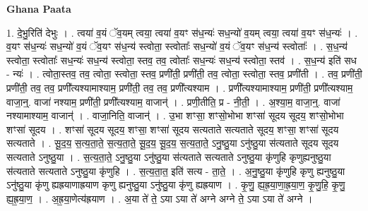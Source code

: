 \documentclass[17pt]{extarticle}
\begin{document}
\textbf{Ghana Paata } \newline

1. दे॒भु॒रिति॑ देभुः । . त्वया॑ व॒यं ॅव॒यम् त्वया॒ त्वया॑ व॒यꣳ स॑ध॒न्यः॑ सध॒न्यो॑ व॒यम् त्वया॒ त्वया॑ व॒यꣳ स॑ध॒न्यः॑ । . व॒यꣳ स॑ध॒न्यः॑ सध॒न्यो॑ व॒यं ॅव॒यꣳ स॑ध॒न्य॑ स्त्वोता॒ स्त्वोताः᳚ सध॒न्यो॑ व॒यं ॅव॒यꣳ स॑ध॒न्य॑ स्त्वोताः᳚ । . स॒ध॒न्य॑ स्त्वोता॒ स्त्वोताः᳚ सध॒न्यः॑ सध॒न्य॑ स्त्वोता॒ स्तव॒ तव॒ त्वोताः᳚ सध॒न्यः॑ सध॒न्य॑ स्त्वोता॒ स्तव॑ । . स॒ध॒न्य॑ इति॑ सध - न्यः॑ । . त्वोता॒स्तव॒ तव॒ त्वोता॒ स्त्वोता॒ स्तव॒ प्रणी॑ती॒ प्रणी॑ती॒ तव॒ त्वोता॒ स्त्वोता॒ स्तव॒ प्रणी॑ती । . तव॒ प्रणी॑ती॒ प्रणी॑ती॒ तव॒ तव॒ प्रणी᳚त्यश्यामाश्याम॒ प्रणी॑ती॒ तव॒ तव॒ प्रणी᳚त्यश्याम । . प्रणी᳚त्यश्यामाश्याम॒ प्रणी॑ती॒ प्रणी᳚त्यश्याम॒ वाजा॒न्॒. वाजा॑ नश्याम॒ प्रणी॑ती॒ प्रणी᳚त्यश्याम॒ वाजान्॑ । . प्रणी॒तीति॒ प्र - नी॒ती॒ । . अ॒श्या॒म॒ वाजा॒न्॒. वाजा॑ नश्यामाश्याम॒ वाजान्॑ । . वाजा॒निति॒ वाजान्॑ । . उ॒भा शꣳसा॒ शꣳसो॒भोभा शꣳसा॑ सूदय सूदय॒ शꣳसो॒भोभा शꣳसा॑ सूदय । . शꣳसा॑ सूदय सूदय॒ शꣳसा॒ शꣳसा॑ सूदय सत्यताते सत्यताते सूदय॒ शꣳसा॒ शꣳसा॑ सूदय सत्यताते । . सू॒द॒य॒ स॒त्य॒ता॒ते॒ स॒त्य॒ता॒ते॒ सू॒द॒य॒ सू॒द॒य॒ स॒त्य॒ता॒ते॒ ऽनु॒ष्ठु॒या ऽनु॑ष्ठु॒या स॑त्यताते सूदय सूदय सत्यताते ऽनुष्ठु॒या । . स॒त्य॒ता॒ते॒ ऽनु॒ष्ठु॒या ऽनु॑ष्ठु॒या स॑त्यताते सत्यताते ऽनुष्ठु॒या कृ॑णुहि कृणुह्यनुष्ठु॒या स॑त्यताते सत्यताते ऽनुष्ठु॒या कृ॑णुहि । . स॒त्य॒ता॒त॒ इति॑ सत्य - ता॒ते॒ । . अ॒नु॒ष्ठु॒या कृ॑णुहि कृणु ह्यनुष्ठु॒या ऽनु॑ष्ठु॒या कृ॑णु ह्यह्रयाणाह्रयाण कृणु ह्यनुष्ठु॒या ऽनु॑ष्ठु॒या कृ॑णु ह्यह्रयाण । . कृ॒णु॒ ह्य॒ह्र॒या॒णा॒ह्र॒या॒ण॒ कृ॒णु॒हि॒ कृ॒णु॒ ह्य॒ह्र॒या॒ण॒ । . अ॒ह्र॒या॒णेत्य॑ह्रयाण । . अ॒या ते॑ ते॒ ऽया ऽया ते॑ अग्ने अग्ने ते॒ ऽया ऽया ते॑ अग्ने । \newline
\end{document}
